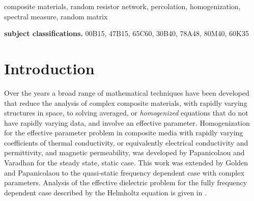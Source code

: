 \documentclass{cmslatex}
\begin{document}
\begin{keywords}
composite materials, random resistor network, percolation,
homogenization, spectral measure, random matrix 
\smallskip

{\bf subject classifications.}
00B15,
47B15,
65C60,
30B40,
78A48,
80M40,
60K35
\end{keywords}


\section{Introduction}\label{Introduction}
%
Over the years a broad range of mathematical techniques have been
developed that reduce the analysis of complex composite materials,
with rapidly varying structures in space, to solving averaged, or
\emph{homogenized} equations that do not have rapidly varying data,
and involve an effective parameter. Homogenization for the effective
parameter problem in composite media with rapidly varying coefficients
of thermal conductivity, or equivalently \cite{MILTON:2002:TC}
electrical conductivity and permittivity, and magnetic permeability,
was developed by Papanicolaou and Varadhan \cite{Papanicolaou:RF-835}
for the steady state, static case. This work was extended
\cite{Golden:CMP-473,Golden:JSP-655} by Golden and Papanicolaou to the
quasi-static frequency dependent case with complex
parameters. Analysis of the effective dielectric problem for the fully
frequency dependent case described by the Helmholtz equation is given
in \cite{Simeonova:MMS:1113}.
\end{document}
